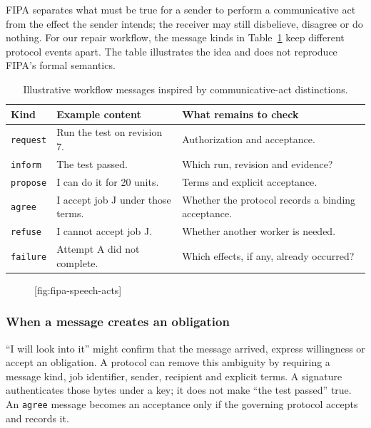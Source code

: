 FIPA separates what must be true for a sender to perform a communicative act
from the effect the sender intends; the receiver may still disbelieve,
disagree or do nothing. For our repair workflow, the message kinds in
Table~\ref{tab:fipa-performatives} keep different protocol events apart. The
table illustrates the idea and does not reproduce FIPA's formal semantics.

\begin{table}[H]
\centering\small
\begin{tabularx}{\textwidth}{@{}l>{\raggedright\arraybackslash}X>{\raggedright\arraybackslash}X@{}}
\toprule
\textbf{Kind} & \textbf{Example content} & \textbf{What remains to check}\\
\midrule
\texttt{request} & Run the test on revision 7. & Authorization and acceptance.\\
\texttt{inform} & The test passed. & Which run, revision and evidence?\\
\texttt{propose} & I can do it for 20 units. & Terms and explicit acceptance.\\
\texttt{agree} & I accept job J under those terms. & Whether the protocol records a binding acceptance.\\
\texttt{refuse} & I cannot accept job J. & Whether another worker is needed.\\
\texttt{failure} & Attempt A did not complete. & Which effects, if any, already occurred?\\
\bottomrule
\end{tabularx}
\caption{Illustrative workflow messages inspired by communicative-act distinctions.}
\label{tab:fipa-performatives}
\end{table}


\begin{figure}[tp]
  \centering
  [fig:fipa-speech-acts]
\end{figure}

\subsubsection{When a message creates an obligation}
\label{sec:why-fipa-matters}

``I will look into it'' might confirm that the message arrived, express
willingness or accept an obligation. A protocol can remove this ambiguity by requiring a message kind,
job identifier, sender, recipient and explicit terms. A signature authenticates
those bytes under a key; it does not make ``the test passed'' true. An
\texttt{agree} message becomes an acceptance only if the governing protocol
accepts and records it.

